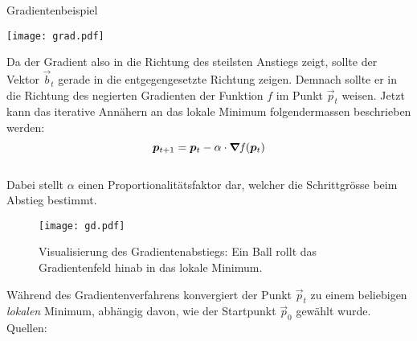 \begin{appendices}
\begin{examplebox}{Gradientenbeispiel}
  \begin{center}
    \texttt{[image: grad.pdf]}
  \end{center}
\end{examplebox}
\para{}
Da der Gradient also in die Richtung des steilsten Anstiegs zeigt, sollte der Vektor
$\vec{b}_t$ gerade in die entgegengesetzte Richtung zeigen. Demnach sollte er in die Richtung des negierten Gradienten der Funktion $f$ im Punkt $\vec{p}_t$ weisen.
Jetzt kann das iterative Annähern an das lokale Minimum folgendermassen beschrieben
werden:
\\
\begin{equation}\label{eq:gradientdescent}
  \bm{p}_{t+1} = \bm{p}_t - \alpha \cdot \bm{\nabla} \mathit{f}(\bm{p}_t)
\end{equation}
\\
Dabei stellt $\alpha$ einen Proportionalitätsfaktor dar, welcher die
Schrittgrösse beim Abstieg bestimmt.

\ifcp%
\begin{figure}[h!]
  \centering
  \texttt{[image: gd.pdf]}
  \caption{Visualisierung des Gradientenabstiegs: Ein Ball rollt das
    Gradientenfeld hinab in das lokale Minimum.}
\end{figure}
\fi%

Während des Gradientenverfahrens konvergiert der Punkt $\vec{p}_t$ zu einem
beliebigen \textit{lokalen} Minimum, abhängig davon, wie der Startpunkt
$\vec{p}_0$ gewählt wurde.
\para{}
Quellen: \cite{book:hands-on} \cite{Nielsen}


\end{appendices}
